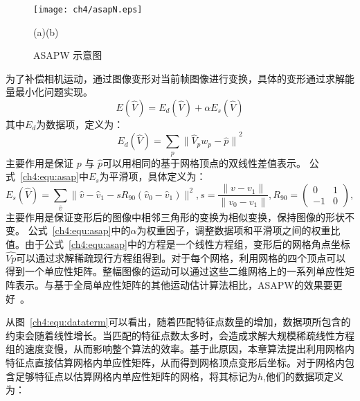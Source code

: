  \begin{figure}[!htbp]
\begin{center}
  \texttt{[image: ch4/asapN.eps]}
  \par \quad\quad\quad(a)\quad\quad\quad\quad\quad\quad\quad\quad\quad\quad\quad\quad(b)

\end{center}

\caption{ASAPW 示意图~\cite{Liu_2013ASAP}}
\label{ch4:fig:2}       %
\end{figure}
为了补偿相机运动，通过图像变形对当前帧图像进行变换，具体的变形通过求解能量最小化问题实现。
\begin{equation}\label{ch4:equ:asap}
  E(\hat{V}) = {E}_d(\hat{V}) + \alpha{E}_{s}(\hat{V})
\end{equation}
其中$E_d$为数据项，定义为：
\begin{equation}\label{ch4:equ:dataterm}
  {E}_{d}(\hat{V}) = \sum_{p}{\parallel\hat{V}_{p}{w}_{p}- \hat{p}\parallel}^{2}
\end{equation}
主要作用是保证 \(p\) 与 $\hat{p}$可以用相同的基于网格顶点的双线性差值表示。 公式~\ref{ch4:equ:asap}中$E_s$为平滑项，具体定义为：
$${E}_{s}(\hat{V} )= \sum_{\hat{v}}\parallel\hat{v}-\hat{v}_{1} - s{R}_{90}(\hat{v}_{0} - \hat{v}_{1})\parallel^{2}, s=\frac{\parallel{v}-{v}_{1}\parallel}{\parallel{v}_{0}-{v}_{1}\parallel},{R}_{90} = \left(\begin{array}{cc}{0} &{1} \\{-1} &{0}\end{array}\right),$$
主要作用是保证变形后的图像中相邻三角形的变换为相似变换，保持图像的形状不变。
公式~\ref{ch4:equ:asap}中的$\alpha$为权重因子，调整数据项和平滑项之间的权重比值。由于公式~\ref{ch4:equ:asap}中的方程是一个线性方程组，变形后的网格角点坐标$\hat{Vp}$可以通过求解稀疏现行方程组得到。对于每个网格，利用网格的四个顶点可以得到一个单应性矩阵。整幅图像的运动可以通过这些二维网格上的一系列单应性矩阵表示。与基于全局单应性矩阵的其他运动估计算法相比，ASAPW的效果要更好~\cite{Liu_2013ASAP}。 \par
从图~\ref{ch4:equ:dataterm}可以看出，随着匹配特征点数量的增加，数据项所包含的约束会随着线性增长。当匹配的特征点数太多时，会造成求解大规模稀疏线性方程组的速度变慢，从而影响整个算法的效率。基于此原因，本章算法提出利用网格内特征点直接估算网格内单应性矩阵，从而得到网格顶点变形后坐标。对于网格内包含足够特征点以估算网格内单应性矩阵的网格，将其标记为$h$,他们的数据项定义为：

